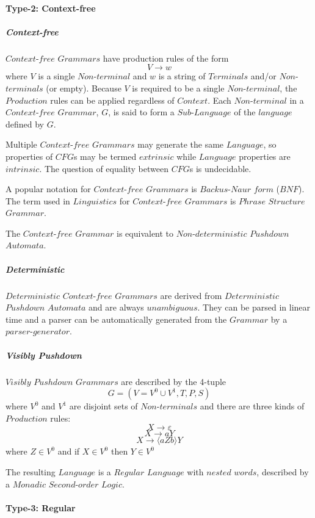 \documentclass{article}
\begin{document}
\paragraph{Type-2: Context-free}

    \subparagraph{Context-free}
    $Context$-$free$ $Grammars$ have production rules of the form
    \[
        V \rightarrow w
    \]
    where $V$ is a single $Non$-$terminal$ and $w$ is a string of
    $Terminals$ and/or $Non$-$terminals$ (or empty). Because $V$ is
    required to be a single $Non$-$terminal$, the $Production$ rules
    can be applied regardless of $Context$. Each $Non$-$terminal$ in a
    $Context$-$free$ $Grammar$, $G$, is said to form a
    $Sub$-$Language$ of the $language$ defined by $G$.

    Multiple $Context$-$free$ $Grammars$ may generate the same
    $Language$, so properties of $CFG$s may be termed $extrinsic$
    while $Language$ properties are $intrinsic$. The question of
    equality between $CFG$s is undecidable.

    A popular notation for $Context$-$free$ $Grammars$ is
    $Backus$-$Naur$ $form$ ($BNF$). The term used in $Linguistics$ for
    $Context$-$free$ $Grammars$ is $Phrase$ $Structure$ $Grammar$.

    The $Context$-$free$ $Grammar$ is equivalent to
    $Non$-$deterministic$ $Pushdown$ $Automata$.

    \subparagraph{Deterministic}
    $Deterministic$ $Context$-$free$ $Grammars$ are derived from
    $Deterministic$ $Pushdown$ $Automata$ and are always
    $unambiguous$. They can be parsed in linear time and a parser can
    be automatically generated from the $Grammar$ by a
    $parser$-$generator$.

    \subparagraph{Visibly Pushdown}
    $Visibly$ $Pushdown$ $Grammars$ are described by the 4-tuple
    \[
        G = (V=V^0 \cup V^1,T,P,S)
    \]
    where $V^0$ and $V^1$ are disjoint sets of $Non$-$terminals$ and
    there are three kinds of $Production$ rules:
    \[
        X \rightarrow \varepsilon
    \]\[
        X \rightarrow aY
    \]\[
        X \rightarrow \langle aZb \rangle Y
    \]
    where $Z \in V^0$ and if $X \in V^0$ then $Y \in V^0$

    The resulting $Language$ is a $Regular$ $Language$ with $nested$
    $words$, described by a $Monadic$ $Second$-$order$ $Logic$.

\paragraph{Type-3: Regular}
\end{document}
